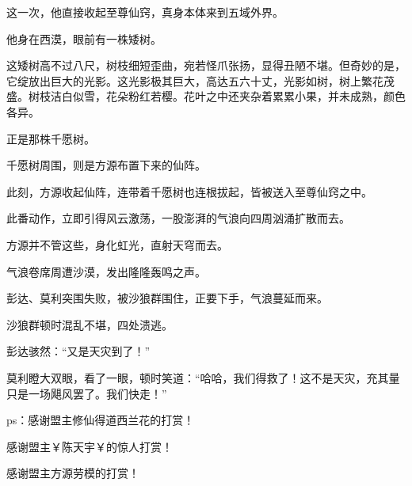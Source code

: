 \begin{this_body}
这一次，他直接收起至尊仙窍，真身本体来到五域外界。

他身在西漠，眼前有一株矮树。

这矮树高不过八尺，树枝细短歪曲，宛若怪爪张扬，显得丑陋不堪。但奇妙的是，它绽放出巨大的光影。这光影极其巨大，高达五六十丈，光影如树，树上繁花茂盛。树枝洁白似雪，花朵粉红若樱。花叶之中还夹杂着累累小果，并未成熟，颜色各异。

正是那株千愿树。

千愿树周围，则是方源布置下来的仙阵。

此刻，方源收起仙阵，连带着千愿树也连根拔起，皆被送入至尊仙窍之中。

此番动作，立即引得风云激荡，一股澎湃的气浪向四周汹涌扩散而去。

方源并不管这些，身化虹光，直射天穹而去。

气浪卷席周遭沙漠，发出隆隆轰鸣之声。

彭达、莫利突围失败，被沙狼群围住，正要下手，气浪蔓延而来。

沙狼群顿时混乱不堪，四处溃逃。

彭达骇然：“又是天灾到了！”

莫利瞪大双眼，看了一眼，顿时笑道：“哈哈，我们得救了！这不是天灾，充其量只是一场飓风罢了。我们快走！”

ps：感谢盟主修仙得道西兰花的打赏！

感谢盟主￥陈天宇￥的惊人打赏！

感谢盟主方源劳模的打赏！

\end{this_body}

